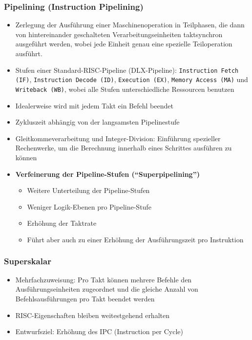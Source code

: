 \subsubsection{Pipelining (Instruction Pipelining)}
\begin{itemize}
	\item Zerlegung der Ausführung einer Maschinenoperation in Teilphasen, die dann von hintereinander geschalteten Verarbeitungseinheiten taktsynchron ausgeführt werden, wobei jede Einheit genau eine spezielle Teiloperation ausführt.
	\item Stufen einer Standard-RISC-Pipeline (DLX-Pipeline): \texttt{Instruction Fetch (IF)}, \texttt{Instruction Decode (ID)}, \texttt{Execution (EX)}, \texttt{Memory Access (MA)} und \texttt{Writeback (WB)}, wobei alle Stufen unterschiedliche Ressourcen benutzen
	\item Idealerweise wird mit jedem Takt ein Befehl beendet
	\item Zykluszeit abhängig von der langsamsten Pipelinestufe
	\item Gleitkommeverarbeitung und Integer-Division: Einführung spezieller Rechenwerke, um die Berechnung innerhalb eines Schrittes ausführen zu können
	\item \textbf{Verfeinerung der Pipeline-Stufen ("`Superpipelining"')}
	\begin{itemize}
		\item Weitere Unterteilung der Pipeline-Stufen
		\item Weniger Logik-Ebenen pro Pipeline-Stufe %
		\item Erhöhung der Taktrate
		\item Führt aber auch zu einer Erhöhung der Ausführungszeit pro Instruktion
	\end{itemize}
\end{itemize}

\subsubsection{Superskalar}
\begin{itemize}
	\item Mehrfachzuweisung: Pro Takt können mehrere Befehle den Ausführungseinheiten zugeordnet und die gleiche Anzahl von Befehlsausführungen pro Takt beendet werden
	\item RISC-Eigenschaften bleiben weitestgehend erhalten
	\item Entwurfsziel: Erhöhung des IPC (Instruction per Cycle)
\end{itemize}

